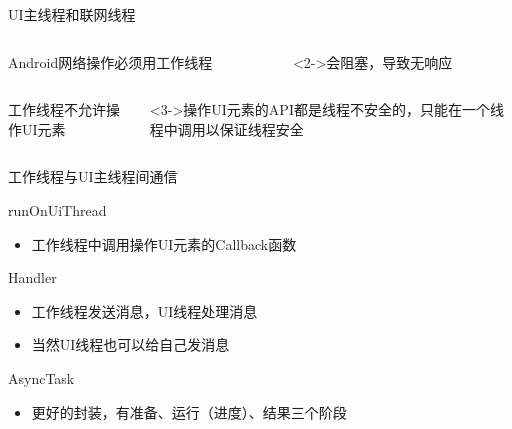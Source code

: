 \documentclass[presentation,dvipdfmx,CJKbookmarks]{beamer}
\begin{document}
\begin{CJK*}{UTF8}{simsun}
\begin{frame}[label={sec:org0e65b44}]{UI\thinspace 主线程和联网线程}
\begin{columns}
\begin{column}{0.4\columnwidth}
\begin{block}{Android\thinspace 网络操作必须用工作线程}
\end{block}
\end{column}
\begin{column}{0.4\columnwidth}
\begin{block}<2->{会阻塞，导致无响应}
\end{block}
\end{column}
\end{columns}
\begin{columns}
\begin{column}{0.4\columnwidth}
\begin{block}{工作线程不允许操作\thinspace UI\thinspace 元素}
\end{block}
\end{column}
\begin{column}{0.4\columnwidth}
\begin{block}<3->{操作\thinspace UI\thinspace 元素的\thinspace API\thinspace 都是线程不安全的，只能在一个线程中调用以保证线程安全}
\end{block}
\end{column}
\end{columns}
\end{frame}

\begin{frame}[label={sec:orgde651bf}]{工作线程与\thinspace UI\thinspace 主线程间通信}
\begin{block}{runOnUiThread}
\begin{itemize}
\item 工作线程中调用操作\thinspace UI\thinspace 元素的\thinspace Callback\thinspace 函数
\end{itemize}
\end{block}
\begin{block}{Handler}
\begin{itemize}
\item 工作线程发送消息，UI\thinspace 线程处理消息
\item 当然\thinspace UI\thinspace 线程也可以给自己发消息
\end{itemize}
\end{block}

\begin{block}{AsyncTask}
\begin{itemize}
\item 更好的封装，有准备、运行（进度）、结果三个阶段
\end{itemize}
\end{block}
\end{frame}


\end{CJK*}
\end{document}
